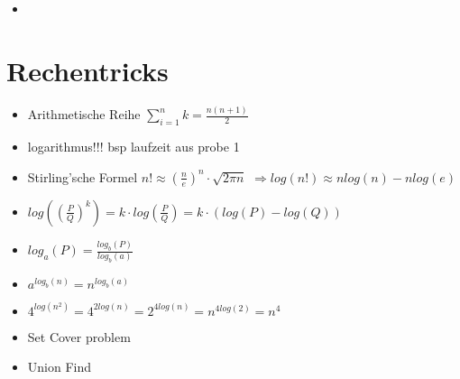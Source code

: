 \documentclass{article}
\begin{document}
\subsection{}
\begin{itemize}
\item
\end{itemize}



\section{Rechentricks}
\begin{itemize}
\item Arithmetische Reihe $\sum_{i=1}^n k  = \frac{n(n+1)}{2} $
\item logarithmus!!! bsp laufzeit aus probe 1
\item Stirling'sche Formel $n! \approx (\frac{n}{e})^n \cdot \sqrt{2\pi n}$ \newline
$ \Rightarrow  log(n!) \approx nlog(n)-nlog(e)$
\item $log((\frac{P}{Q})^k) = k \cdot log(\frac{P}{Q}) = k \cdot (log(P) - log(Q)) $
\item $log_a(P) = \frac{log_b(P)}{log_b(a)}$
\item $a^{log_b(n)} = n^{log_b(a)}$
\item $4^{log(n^2)} = 4^{2log(n)} =2^{4log(n)} = n^{4log(2)} = n^4 $

\item Set Cover problem
\item Union Find

\end{itemize}
\end{document}
